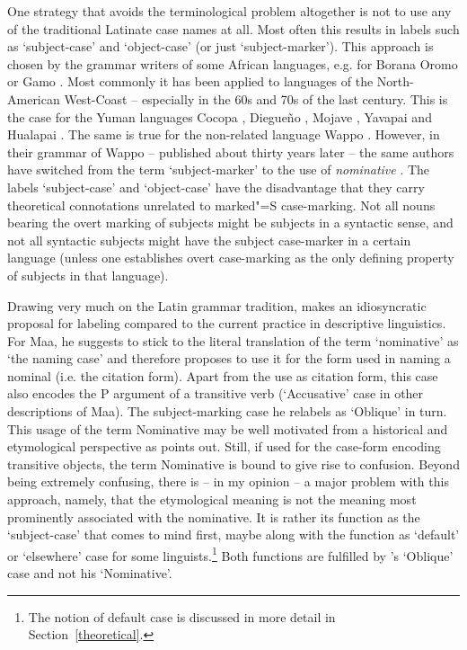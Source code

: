 One strategy that avoids the terminological problem altogether is not to use any of the traditional Latinate case names at all. 
Most often this results in labels such as `subject-case' and `object-case' (or just `subject-marker'). 
This approach is chosen by the grammar writers of some African languages, e.g. for Borana Oromo \citep[34]{Stroomer:1995} or Gamo \citep[364]{Hompo:1990}. 
Most commonly it has been applied to languages of the North-American West-Coast -- especially in the 60s and 70s of the last century. 
This is the case for the Yuman languages Cocopa \citep[104]{Crawford:1966}, Diegue\~no \citep[151]{Langdon:1970}, Mojave \citep[18]{Munro:1976}, Yavapai \citep[68]{Kendall:1976} and Hualapai \citep[38]{Watahomigie:2001}. 
The same is true for the non-related language Wappo \citep*[90]{Lietal:1977}. 
However, in their grammar of Wappo -- published about thirty years later -- the same authors have switched from the term `subject-marker' to the use of \textit{nominative} \citep*{Thompsonetal:2006}. 
The labels `subject-case' and `object-case' have the disadvantage that they carry theoretical connotations unrelated to marked"=S case-marking. 
Not all nouns bearing the overt marking of subjects might be subjects in a syntactic sense, and not all syntactic subjects might have the subject case-marker in a certain language (unless one establishes overt case-marking as the only defining property of subjects in that language). 

Drawing very much on the Latin grammar tradition, \citet{Melcuk:1997} makes an idiosyncratic proposal for labeling compared to the current practice in descriptive linguistics. 
For Maa, he suggests to stick to the literal translation of the term `nominative' as `the naming case' and therefore proposes to use it for the form used in naming a nominal (i.e. the citation form). 
Apart from the use as citation form, this case also encodes the P argument of a transitive verb (`Accusative' case in other descriptions of Maa). 
The subject-marking case he relabels as `Oblique' in turn. 
This usage of the term Nominative may be well motivated from a historical and etymological perspective as \citet[453]{Creissels:2009} points out. 
Still, if used for the case-form encoding transitive objects, the term Nominative is bound to give rise to confusion. 
Beyond being extremely confusing, there is -- in my opinion -- a major problem with this approach, %
namely, that the etymological meaning is not the meaning most prominently associated with the nominative. 
It is rather its function as the `subject-case' that comes to mind first, maybe along with the function as `default' or `elsewhere' case for some linguists.\footnote{The notion of default case is discussed in more detail in Section~\ref{theoretical}.} 
Both functions are fulfilled by \citeauthor{Melcuk:1997}'s `Oblique' case and not his `Nominative'.

